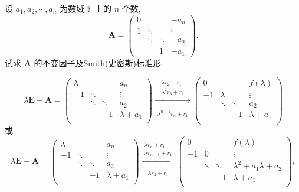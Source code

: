 \documentclass[../../main.tex]{subfiles}%
\begin{document}
\begin{example}
设 $a_1, a_2, \cdots, a_n$ 为数域 $\mathbb{F}$ 上的 $n$ 个数,
\[
\boldsymbol{A} = \begin{pmatrix} 
0 & & & -a_n \\
1 & \ddots & & \vdots \\
& \ddots & \ddots & -a_2 \\
& & 1 & -a_1 
\end{pmatrix}.
\]
试求 $\boldsymbol{A}$ 的不变因子及Smith(史密斯)标准形.
\end{example}
\begin{solution}

$$\lambda\boldsymbol{E}-\boldsymbol{A}=\begin{pmatrix}
\lambda& & & a_n\\
-1& \ddots& & \vdots\\
& \ddots& \ddots& a_2\\
& & -1& \lambda +a_1\\
\end{pmatrix}\xrightarrow[\substack{\cdots \cdots\\\lambda ^{n-1}r_n+r_1}]{\substack{\lambda r_2+r_1\\\lambda ^2r_3+r_1}}\begin{pmatrix}
0& & & f\left( \lambda \right)\\
-1& \lambda& & \vdots\\
& \ddots& \ddots& a_2\\
& & -1& \lambda +a_1\\
\end{pmatrix}$$
或
$$\lambda\boldsymbol{E}-\boldsymbol{A}=\begin{pmatrix}
\lambda& & & a_n\\
-1& \ddots& & \vdots\\
& \ddots& \ddots& a_2\\
& & -1& \lambda +a_1\\
\end{pmatrix}\xrightarrow[\substack{\cdots \cdots\\\lambda r_2+r_1}]{\substack{\lambda r_n+r_1\\\lambda r_{n-1}+r_1}}\begin{pmatrix}
0& & & f\left( \lambda \right)\\
-1& 0& & \vdots\\
& \ddots& \ddots& \lambda ^2+a_1\lambda +a_2\\
& & -1& \lambda +a_1\\
\end{pmatrix},$$

\end{solution}
\end{document}
